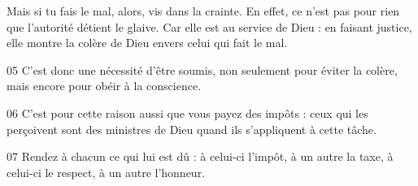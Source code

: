 Mais si tu fais le mal, alors, vis dans la crainte. En effet, ce n’est pas pour rien que l’autorité détient le glaive. Car elle est au service de Dieu : en faisant justice, elle montre la colère de Dieu envers celui qui fait le mal.

05 C’est donc une nécessité d’être soumis, non seulement pour éviter la colère, mais encore pour obéir à la conscience.

06 C’est pour cette raison aussi que vous payez des impôts : ceux qui les perçoivent sont des ministres de Dieu quand ils s’appliquent à cette tâche.

07 Rendez à chacun ce qui lui est dû : à celui-ci l’impôt, à un autre la taxe, à celui-ci le respect, à un autre l’honneur.
